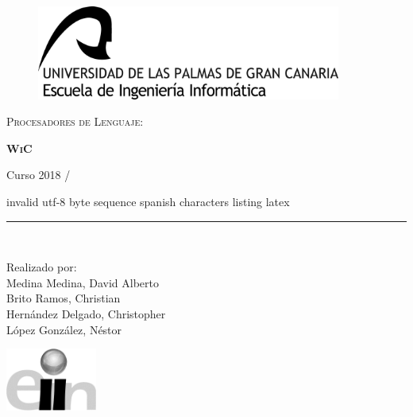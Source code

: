 \documentclass[11pt, english]{article}
\makeatletter
\newcounter{unomenos}
\gdef\@date{ Curso  2018 / \arabic{unomenos}}
\makeatother
\begin{document}
\begin{titlepage}

\begin{center}
\vspace*{-1in}
\begin{figure}[htb]
\begin{center}
\includegraphics[width=10cm]{../res/pics/logo.jpg}
\end{center}
\end{figure}

\vspace*{0.4in}
\begin{large}
\textsc{Procesadores de Lenguaje}:\\
\end{large}
\vspace*{0.2in}
\begin{Large}
\textbf{\textsc{WiC}}\\
\end{Large}
\vspace*{0.3in}
\begin{large}
\@date\\
\end{large}
\vspace*{0.3in}invalid utf-8 byte sequence spanish characters listing latex
\rule{80mm}{0.1mm}\\
\vspace*{0.1in}
\begin{large}
Realizado por: \\

Medina Medina, David Alberto  \\
Brito Ramos, Christian  \\
Hernández Delgado, Christopher \\
López González, Néstor \\
\vspace*{0.3in}
\end{large}
\includegraphics[width=3cm]{../res/pics/LogoEscuela.jpg}
\end{center}
\end{titlepage}
\end{document}
